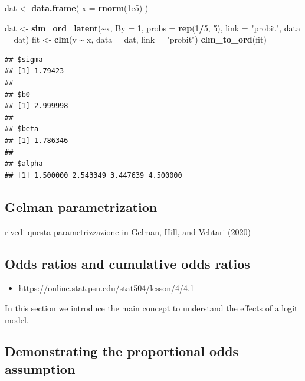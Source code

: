 \documentclass[
  man,floatsintext]{apa6}
\newenvironment{Shaded}{\begin{snugshade}}{\end{snugshade}}
\newcommand{\AttributeTok}[1]{\textcolor[rgb]{0.13,0.29,0.53}{#1}}
\newcommand{\DecValTok}[1]{\textcolor[rgb]{0.00,0.00,0.81}{#1}}
\newcommand{\FloatTok}[1]{\textcolor[rgb]{0.00,0.00,0.81}{#1}}
\newcommand{\FunctionTok}[1]{\textcolor[rgb]{0.13,0.29,0.53}{\textbf{#1}}}
\newcommand{\NormalTok}[1]{#1}
\newcommand{\OtherTok}[1]{\textcolor[rgb]{0.56,0.35,0.01}{#1}}
\newcommand{\SpecialCharTok}[1]{\textcolor[rgb]{0.81,0.36,0.00}{\textbf{#1}}}
\newcommand{\StringTok}[1]{\textcolor[rgb]{0.31,0.60,0.02}{#1}}
\providecommand{\tightlist}{%
  \setlength{\itemsep}{0pt}\setlength{\parskip}{0pt}}
\begin{document}
\begin{Shaded}
\begin{Highlighting}[]
\NormalTok{dat }\OtherTok{\textless{}{-}} \FunctionTok{data.frame}\NormalTok{(}
  \AttributeTok{x =} \FunctionTok{rnorm}\NormalTok{(}\FloatTok{1e5}\NormalTok{)}
\NormalTok{)}

\NormalTok{dat }\OtherTok{\textless{}{-}} \FunctionTok{sim\_ord\_latent}\NormalTok{(}\SpecialCharTok{\textasciitilde{}}\NormalTok{x, }\AttributeTok{By =} \DecValTok{1}\NormalTok{, }\AttributeTok{probs =} \FunctionTok{rep}\NormalTok{(}\DecValTok{1}\SpecialCharTok{/}\DecValTok{5}\NormalTok{, }\DecValTok{5}\NormalTok{), }\AttributeTok{link =} \StringTok{"probit"}\NormalTok{, }\AttributeTok{data =}\NormalTok{ dat)}
\NormalTok{fit }\OtherTok{\textless{}{-}} \FunctionTok{clm}\NormalTok{(y }\SpecialCharTok{\textasciitilde{}}\NormalTok{ x, }\AttributeTok{data =}\NormalTok{ dat, }\AttributeTok{link =} \StringTok{"probit"}\NormalTok{)}
\FunctionTok{clm\_to\_ord}\NormalTok{(fit)}
\end{Highlighting}
\end{Shaded}

\begin{verbatim}
## $sigma
## [1] 1.79423
## 
## $b0
## [1] 2.999998
## 
## $beta
## [1] 1.786346
## 
## $alpha
## [1] 1.500000 2.543349 3.447639 4.500000
\end{verbatim}

\subsection{Gelman parametrization}\label{gelman-parametrization}

rivedi questa parametrizzazione in Gelman, Hill, and Vehtari (2020)

\subsection{Odds ratios and cumulative odds ratios}\label{odds-ratios-and-cumulative-odds-ratios}

\begin{itemize}
\tightlist
\item
  \url{https://online.stat.psu.edu/stat504/lesson/4/4.1}
\end{itemize}

In this section we introduce the main concept to understand the effects of a logit model.

\subsection{Demonstrating the proportional odds assumption}\label{demonstrating-the-proportional-odds-assumption}
\end{document}
